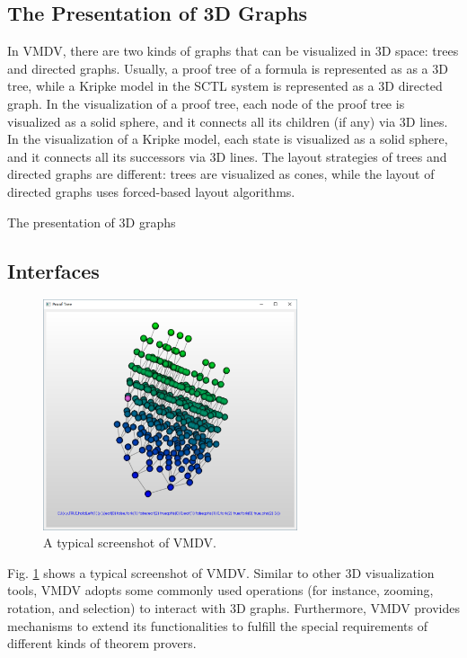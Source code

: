 \documentclass[runningheads]{llncs}
\newcommand\tool[1]{\textsf{#1}}
\newcommand\vmdv{\tool{VMDV}}
\begin{document}
{\color{red}

\subsection{\bf The Presentation of 3D Graphs}
In \tool{VMDV}, there are two kinds of graphs that can be visualized in 3D space: trees and directed graphs. Usually, a proof tree of a formula is represented as as a 3D tree, while a Kripke model in the \textsf{SCTL} system is represented as a 3D directed graph.
In the visualization of a proof tree, each node of the proof tree is visualized as a solid sphere, and it connects all its children (if any) via 3D lines. In the visualization of a Kripke model, each state is visualized as a solid sphere, and it connects all its successors via 3D lines. The layout strategies of trees and directed graphs are different: trees are visualized as cones, while the layout of directed graphs uses forced-based layout algorithms.



The presentation of 3D graphs



}



\subsection{Interfaces}
\begin{figure}[t]
	\centering
	\includegraphics[width=7.5cm]{./050407.png}
	\caption{A typical screenshot of \textsf{VMDV}.}
	\label{fig:screenshot}
\end{figure}
Fig. \ref{fig:screenshot} shows a typical screenshot of \textsf{VMDV}. 
Similar to other 3D visualization tools, \vmdv{} adopts some commonly used operations (for instance, zooming, rotation, and selection) to interact with 3D graphs. Furthermore, \vmdv{} provides mechanisms to extend its functionalities to fulfill the special requirements of different kinds of theorem provers.
\end{document}
